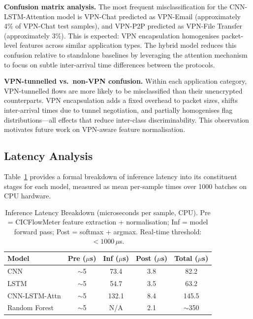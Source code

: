 \documentclass[conference]{IEEEtran}
\begin{document}
\textbf{Confusion matrix analysis.} The most frequent misclassification for the
CNN-LSTM-Attention model is VPN-Chat predicted as VPN-Email (approximately 4\% of
VPN-Chat test samples), and VPN-P2P predicted as VPN-File Transfer (approximately 3\%).
This is expected: VPN encapsulation homogenises packet-level features across
similar application types. The hybrid model reduces this
confusion relative to standalone baselines by leveraging the attention mechanism to focus on
subtle inter-arrival time differences between the protocols.

\textbf{VPN-tunnelled vs.\ non-VPN confusion.} Within each application category,
VPN-tunnelled flows are more likely to be misclassified than their unencrypted
counterparts. VPN encapsulation adds a fixed overhead to packet sizes, shifts
inter-arrival times due to tunnel negotiation, and partially homogenises flag
distributions---all effects that reduce inter-class discriminability. This
observation motivates future work on VPN-aware feature normalisation.

\subsection{Latency Analysis}
\label{ssec:latency}

Table~\ref{tab:latency} provides a formal breakdown of inference latency into
its constituent stages for each model, measured as mean per-sample times over
1000 batches on CPU hardware.

\begin{table}[htbp]
\centering
\renewcommand{\arraystretch}{1.12}
\caption{Inference Latency Breakdown (microseconds per sample, CPU).
         Pre = CICFlowMeter feature extraction + normalisation;
         Inf = model forward pass; Post = softmax + argmax.
         Real-time threshold: $<1000\,\mu$s.}
\label{tab:latency}
\begin{tabular}{lcccc}
\toprule
\textbf{Model} & \textbf{Pre ($\mu$s)} & \textbf{Inf ($\mu$s)}
               & \textbf{Post ($\mu$s)} & \textbf{Total ($\mu$s)} \\
\midrule
CNN           & $\sim$5 & 73.4 & 3.8 &  82.2 \\
LSTM          & $\sim$5 & 54.7 & 3.5 &  63.2 \\
CNN-LSTM-Attn & $\sim$5 & 132.1 & 8.4 & 145.5 \\
Random Forest & $\sim$5 & N/A  & 2.1 & $\sim$350 \\
\bottomrule
\end{tabular}
\end{table}
\end{document}

